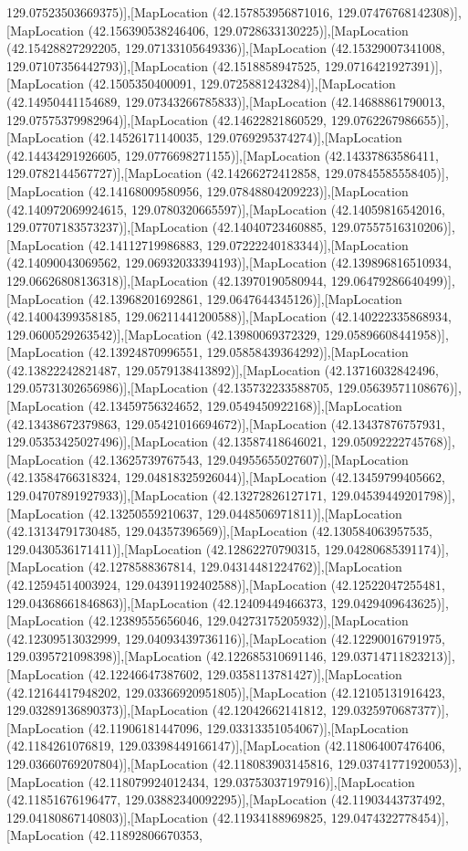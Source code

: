 129.07523503669375)],[MapLocation (42.157853956871016, 129.07476768142308)],[MapLocation (42.156390538246406, 129.0728633130225)],[MapLocation (42.15428827292205, 129.07133105649336)],[MapLocation (42.15329007341008, 129.07107356442793)],[MapLocation (42.1518858947525, 129.0716421927391)],[MapLocation (42.1505350400091, 129.0725881243284)],[MapLocation (42.14950441154689, 129.07343266785833)],[MapLocation (42.14688861790013, 129.07575379982964)],[MapLocation (42.14622821860529, 129.0762267986655)],[MapLocation (42.14526171140035, 129.0769295374274)],[MapLocation (42.14434291926605, 129.0776698271155)],[MapLocation (42.14337863586411, 129.0782144567727)],[MapLocation (42.14266272412858, 129.07845585558405)],[MapLocation (42.14168009580956, 129.07848804209223)],[MapLocation (42.140972069924615, 129.0780320665597)],[MapLocation (42.14059816542016, 129.07707183573237)],[MapLocation (42.14040723460885, 129.07557516310206)],[MapLocation (42.14112719986883, 129.07222240183344)],[MapLocation (42.14090043069562, 129.06932033394193)],[MapLocation (42.139896816510934, 129.06626808136318)],[MapLocation (42.13970190580944, 129.06479286640499)],[MapLocation (42.13968201692861, 129.0647644345126)],[MapLocation (42.14004399358185, 129.06211441200588)],[MapLocation (42.140222335868934, 129.0600529263542)],[MapLocation (42.13980069372329, 129.05896608441958)],[MapLocation (42.13924870996551, 129.05858439364292)],[MapLocation (42.13822242821487, 129.0579138413892)],[MapLocation (42.13716032842496, 129.05731302656986)],[MapLocation (42.135732233588705, 129.05639571108676)],[MapLocation (42.13459756324652, 129.0549450922168)],[MapLocation (42.13438672379863, 129.05421016694672)],[MapLocation (42.13437876757931, 129.05353425027496)],[MapLocation (42.13587418646021, 129.05092222745768)],[MapLocation (42.13625739767543, 129.04955655027607)],[MapLocation (42.13584766318324, 129.04818325926044)],[MapLocation (42.13459799405662, 129.04707891927933)],[MapLocation (42.13272826127171, 129.04539449201798)],[MapLocation (42.13250559210637, 129.0448506971811)],[MapLocation (42.13134791730485, 129.04357396569)],[MapLocation (42.130584063957535, 129.0430536171411)],[MapLocation (42.12862270790315, 129.04280685391174)],[MapLocation (42.1278588367814, 129.04314481224762)],[MapLocation (42.12594514003924, 129.04391192402588)],[MapLocation (42.12522047255481, 129.04368661846863)],[MapLocation (42.12409449466373, 129.0429409643625)],[MapLocation (42.12389555656046, 129.04273175205932)],[MapLocation (42.12309513032999, 129.04093439736116)],[MapLocation (42.12290016791975, 129.0395721098398)],[MapLocation (42.122685310691146, 129.03714711823213)],[MapLocation (42.12246647387602, 129.0358113781427)],[MapLocation (42.12164417948202, 129.03366920951805)],[MapLocation (42.12105131916423, 129.03289136890373)],[MapLocation (42.12042662141812, 129.0325970687377)],[MapLocation (42.11906181447096, 129.03313351054067)],[MapLocation (42.1184261076819, 129.03398449166147)],[MapLocation (42.118064007476406, 129.03660769207804)],[MapLocation (42.118083903145816, 129.03741771920053)],[MapLocation (42.118079924012434, 129.03753037197916)],[MapLocation (42.11851676196477, 129.03882340092295)],[MapLocation (42.11903443737492, 129.04180867140803)],[MapLocation (42.11934188969825, 129.0474322778454)],[MapLocation (42.11892806670353, 